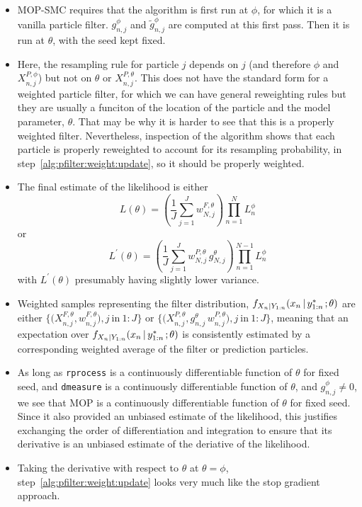 \documentclass[12p]{article}
\newcommand\giventh{{\hspace{0.5mm};\hspace{0.5mm}}}
\newcommand\seq[2]{{#1}\!:\!{#2}}
\newcommand\given{{\,\vert\,}}
\begin{document}
\begin{itemize}
\item MOP-SMC requires that the algorithm is first run at $\phi$, for which it is a vanilla particle filter.  $g^{\phi}_{n,j}$ and $\tilde g^{\phi}_{n,j}$ are computed at this first pass. Then it is run at $\theta$, with the seed kept fixed.

\item Here, the resampling rule for particle $j$ depends on $j$ (and therefore $\phi$ and $X^{P,\phi}_{n,j}$) but not on $\theta$ or  $X^{P,\theta}_{n,j}$. This does not have the standard form for a weighted particle filter, for which we can have general reweighting rules but they are usually a funciton of the location of the particle and the model parameter, $\theta$. That may be why it is harder to see that this is a properly weighted filter. Nevertheless, inspection of the algorithm shows that each particle is properly reweighted to account for its resampling probability, in step~\ref{alg:pfilter:weight:update}, so it should be properly weighted.

\item The final estimate of the likelihood is either
  \begin{equation} \label{mop:lik1}
    L(\theta) = \left(\frac{1}{J}\sum_{j=1}^J w^{F,\theta}_{N,j} \right)
    \prod_{n=1}^N L_n^\phi
  \end{equation}
  or
 \begin{equation}
   L^\prime(\theta) = \left(\frac{1}{J}\sum_{j=1}^J w^{P,\theta}_{N,j} \, g^{\theta}_{N,j}\right)
   \prod_{n=1}^{N-1} L_n^\phi
  \end{equation}
 with $L^\prime(\theta)$ presumably having slightly lower variance.

\item Weighted samples representing the filter distribution,
  $f_{X_n|Y_{1:n}}(x_n \given y^*_{1:n} \giventh \theta)$
  are either
  $\big\{\big(X^{F,\theta}_{n,j},w^{F,\theta}_{n,j}\big),  j\ \mathrm{in}\ \seq{1}{J}\big\}$
  or
  $\big\{\big(X^{P,\theta}_{n,j}, g^\theta_{n,j} \, w^{P,\theta}_{n,j}\big),  j\ \mathrm{in}\ \seq{1}{J}\big\}$,
  meaning that an expectation over $f_{X_n|Y_{1:n}}(x_n \given y^*_{1:n} \giventh \theta)$ is consistently estimated by a corresponding weighted average of the filter or prediction particles.

  \item As long as \texttt{rprocess} is a continuously differentiable function of $\theta$ for fixed seed, and \texttt{dmeasure} is a continuously differentiable function of $\theta$, and $g^{\phi}_{n,j}\neq 0$, we see that MOP is a continuously differentiable function of $\theta$ for fixed seed. Since it also provided an unbiased estimate of the likelihood, this justifies exchanging the order of differentiation and integration to ensure that its derivative is an unbiased estimate of the deriative of the likelihood.

  \item Taking the derivative with respect to $\theta$ at $\theta=\phi$, step~\ref{alg:pfilter:weight:update} looks very much like the stop gradient approach.

  \end{itemize}
\end{document}
